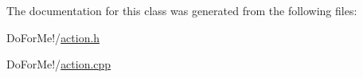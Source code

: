 The documentation for this class was generated from the following files\-:\begin{DoxyCompactItemize}
\item 
Do\-For\-Me!/\hyperlink{action_8h}{action.\-h}\item 
Do\-For\-Me!/\hyperlink{action_8cpp}{action.\-cpp}\end{DoxyCompactItemize}
